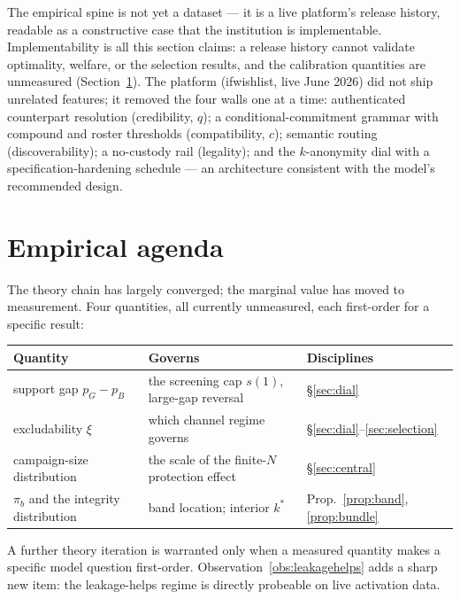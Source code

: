 \documentclass[11pt]{article}
\theoremstyle{definition}
\theoremstyle{remark}
\begin{document}
The empirical spine is not yet a dataset --- it is a live platform's release history,
readable as a constructive case that the institution is implementable. Implementability is
all this section claims: a release history cannot validate optimality, welfare, or the
selection results, and the calibration quantities are unmeasured
(Section~\ref{sec:empirics}). The
platform (ifwishlist, live June 2026) did not ship unrelated features; it removed the four
walls one at a time: authenticated counterpart resolution (credibility, $q$); a
conditional-commitment grammar with compound and roster thresholds (compatibility, $c$);
semantic routing (discoverability); a no-custody rail (legality); and the $k$-anonymity
dial with a specification-hardening schedule --- an architecture consistent with the
model's recommended design.

\section{Empirical agenda}\label{sec:empirics}

The theory chain has largely converged; the marginal value has moved to measurement. Four
quantities, all currently unmeasured, each first-order for a specific result:

\begin{center}
\begin{tabular}{lll}
\toprule
\textbf{Quantity} & \textbf{Governs} & \textbf{Disciplines} \\
\midrule
support gap $p_G - p_B$ & the screening cap $s(1)$, large-gap reversal & \S\ref{sec:dial} \\
excludability $\xi$ & which channel regime governs & \S\ref{sec:dial}--\ref{sec:selection} \\
campaign-size distribution & the scale of the finite-$N$ protection effect & \S\ref{sec:central} \\
$\pi_b$ and the integrity distribution & band location; interior $k^*$ & Prop.~\ref{prop:band}, \ref{prop:bundle} \\
\bottomrule
\end{tabular}
\end{center}

A further theory iteration is warranted only when a measured quantity makes a specific
model question first-order. Observation~\ref{obs:leakagehelps} adds a sharp new item:
the leakage-helps regime is directly probeable on live activation data.
\end{document}
